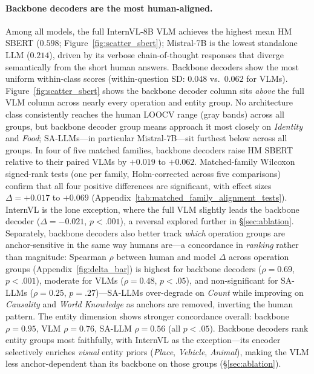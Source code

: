 \documentclass[letterpaper]{article}
\begin{document}
\paragraph{Backbone decoders are the most human-aligned.}
Among all models, the full InternVL-8B VLM achieves the highest mean HM SBERT ($0.598$; Figure~\ref{fig:scatter_sbert}); Mistral-7B is the lowest standalone LLM ($0.214$), driven by its verbose chain-of-thought responses that diverge semantically from the short human answers.
Backbone decoders show the most uniform within-class scores (within-question SD: $0.048$ vs.\ $0.062$ for VLMs).
Figure~\ref{fig:scatter_sbert} shows the backbone decoder column sits \emph{above} the full VLM column across nearly every operation and entity group.
No architecture class consistently reaches the human LOOCV range (gray bands) across all groups, but backbone decoder group means approach it most closely on \textit{Identity} and \textit{Food}; SA-LLMs---in particular Mistral-7B---sit furthest below across all groups.
In four of five matched families, backbone decoders raise HM SBERT relative to their paired VLMs by $+0.019$ to $+0.062$.
Matched-family Wilcoxon signed-rank tests (one per family, Holm-corrected across five comparisons) confirm that all four positive differences are significant, with effect sizes $\Delta{=}{+}0.017$ to ${+}0.069$ (Appendix~\ref{tab:matched_family_alignment_tests}).
InternVL is the lone exception, where the full VLM slightly leads the backbone decoder ($\Delta{=}{-}0.021$, $p{<}.001$), a reversal explored further in \S\ref{sec:ablation}.
Separately, backbone decoders also better track \emph{which} operation groups are anchor-sensitive in the same way humans are---a concordance in \emph{ranking} rather than magnitude: Spearman $\rho$ between human and model $\Delta$ across operation groups (Appendix~\ref{fig:delta_bar}) is highest for backbone decoders ($\rho{=}0.69$, $p{<}.001$), moderate for VLMs ($\rho{=}0.48$, $p{<}.05$), and non-significant for SA-LLMs ($\rho{=}0.25$, $p{=}.27$)---SA-LLMs over-degrade on \textit{Count} while improving on \textit{Causality} and \textit{World Knowledge} as anchors are removed, inverting the human pattern.
The entity dimension shows stronger concordance overall: backbone $\rho{=}0.95$, VLM $\rho{=}0.76$, SA-LLM $\rho{=}0.56$ (all $p{<}.05$).
Backbone decoders rank entity groups most faithfully, with InternVL as the exception---its encoder selectively enriches \emph{visual} entity priors (\textit{Place}, \textit{Vehicle}, \textit{Animal}), making the VLM less anchor-dependent than its backbone on those groups (\S\ref{sec:ablation}).
\end{document}

